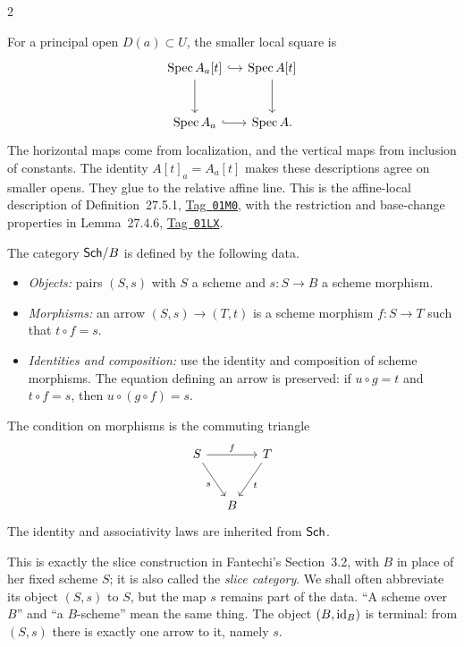\documentclass[12pt]{memoir}
\newcommand{\BGtag}[1]{\href{https://stacks.math.columbia.edu/tag/#1}{Tag~\texttt{#1}}}
\begin{document}
\begin{multicols}{2}
\begin{Ex}
For a principal open $D(a)\subset U$, the smaller local square is
\[
\begin{tikzcd}[column sep=small,row sep=large]
\Spec A_a[t] \arrow[r,hook] \arrow[d]
 &\Spec A[t] \arrow[d]\\
\Spec A_a \arrow[r,hook] &\Spec A.
\end{tikzcd}
\]
The horizontal maps come from localization, and the vertical maps
from inclusion of constants. The identity
$A[t]_a=A_a[t]$ makes these descriptions agree on smaller opens.
They glue to the relative affine line. This is the affine-local
description of Definition~27.5.1, \BGtag{01M0}, with the restriction
and base-change properties in Lemma~27.4.6, \BGtag{01LX}.
\end{Ex}

\begin{Def}\label{def:slice}
The category $\mathsf{Sch}/B$ is defined by the following data.
\begin{itemize}
\item \emph{Objects:} pairs $(S,s)$ with $S$ a scheme and $s:S\to B$
a scheme morphism.
\item \emph{Morphisms:} an arrow $(S,s)\to(T,t)$ is a scheme morphism
$f:S\to T$ such that $t\circ f=s$.
\item \emph{Identities and composition:} use the identity and
composition of scheme morphisms. The equation defining an arrow is
preserved: if $u\circ g=t$ and $t\circ f=s$, then
$u\circ(g\circ f)=s$.
\end{itemize}
The condition on morphisms is the commuting triangle
\[
\begin{tikzcd}[column sep=small,row sep=large]
S \arrow[rr,"f"] \arrow[dr,"s"'] && T \arrow[dl,"t"]\\
& B &
\end{tikzcd}
\]
The identity and associativity laws are inherited from $\mathsf{Sch}$.
\end{Def}

\begin{Rmk}
This is exactly the slice construction in Fantechi's Section~3.2,
with $B$ in place of her fixed scheme $S$; it is
also called the \emph{slice category}. We shall often abbreviate its
object $(S,s)$ to $S$, but the map $s$ remains part of the data.
``A scheme over $B$'' and ``a $B$-scheme'' mean the same thing.
The object $(B,\operatorname{id}_B)$ is terminal: from $(S,s)$ there is exactly one
arrow to it, namely $s$.
\end{Rmk}


\end{multicols}
\end{document}
